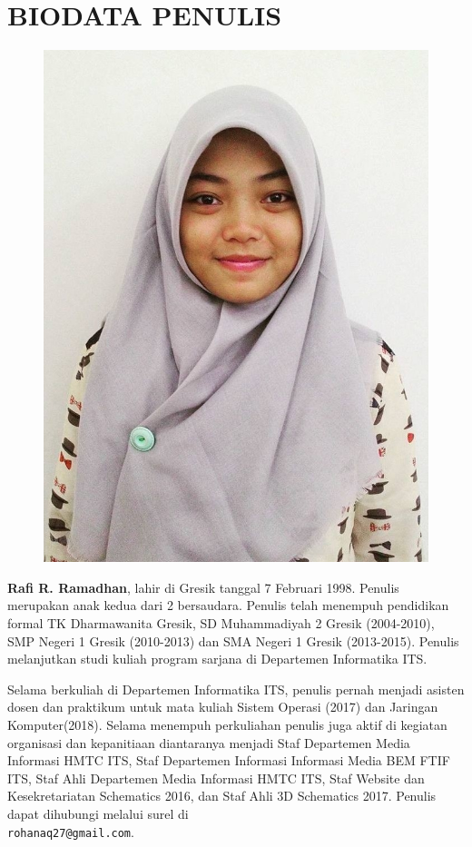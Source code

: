 \chapter{BIODATA PENULIS}
\begin{figure}
	\includegraphics[height=0.3\textheight]{biodata/foto.jpg}
\end{figure}
\textbf{Rafi R. Ramadhan}, lahir di Gresik tanggal 7 Februari 1998. Penulis merupakan anak kedua dari 2 bersaudara. Penulis telah menempuh pendidikan formal TK Dharmawanita Gresik, SD Muhammadiyah 2 Gresik (2004-2010), SMP Negeri 1 Gresik (2010-2013) dan SMA Negeri 1 Gresik (2013-2015). Penulis melanjutkan studi kuliah program sarjana di Departemen Informatika ITS. 

Selama berkuliah di Departemen Informatika ITS, penulis  pernah menjadi asisten dosen dan praktikum untuk mata kuliah Sistem Operasi (2017) dan Jaringan Komputer(2018). Selama menempuh perkuliahan penulis juga aktif di kegiatan organisasi dan kepanitiaan diantaranya menjadi Staf Departemen Media Informasi HMTC ITS, Staf Departemen Informasi Informasi Media BEM FTIF ITS, Staf Ahli Departemen Media Informasi HMTC ITS, Staf Website dan Kesekretariatan Schematics 2016, dan Staf Ahli 3D Schematics 2017. Penulis dapat dihubungi melalui surel di \\ \texttt{rohanaq27@gmail.com}.
